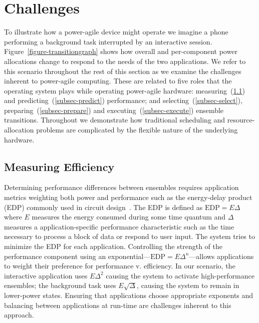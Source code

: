 \section{Challenges}
\label{sec-challenges}



To illustrate how a power-agile device might operate we imagine a phone
performing a background task interrupted by an interactive session.
Figure~\ref{figure-transitiongraph} shows how overall and per-component power
allocations change to respond to the needs of the two applications. We refer
to this scenario throughout the rest of this section as we examine the
challenges inherent to power-agile computing. These are related to five roles
that the operating system plays while operating power-agile hardware:
measuring~(\ref{subsec-measure}) and predicting~(\ref{subsec-predict})
performance; and selecting~(\ref{subsec-select}),
preparing~(\ref{subsec-prepare}) and executing~(\ref{subsec-execute})
ensemble transitions. Throughout we demonstrate how traditional scheduling
and resource-allocation problems are complicated by the flexible nature of
the underlying hardware.

\subsection{Measuring Efficiency}
\label{subsec-measure}

Determining performance differences between ensembles requires application
metrics weighting both power and performance such as the energy-delay product
(EDP) commonly used in circuit design~\cite{martin-et2}. The EDP is defined
as $\textrm{EDP} = E\Delta$ where $E$ measures the energy consumed during
some time quantum and $\Delta$ measures a application-specific performance
characteristic such as the time necessary to process a block of data or
respond to user input. The system tries to minimize the EDP for each
application. Controlling the strength of the performance component using an
exponential---$\textrm{EDP} = E\Delta^n$---allows applications to weight
their preference for performance v. efficiency. In our scenario, the
interactive application uses $E\Delta^2$ causing the system to activate
high-performance ensembles; the background task uses $E\sqrt{\Delta}$,
causing the system to remain in lower-power states. Ensuring that
applications choose appropriate exponents and balancing between applications
at run-time are challenges inherent to this approach.

